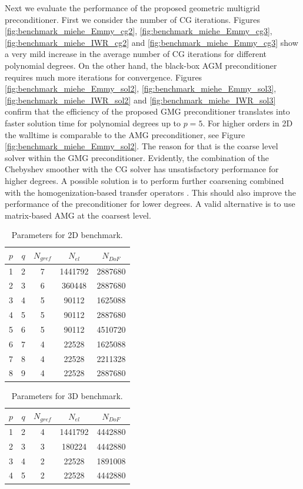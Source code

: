 \documentclass[preprint,12pt,times]{elsarticle}
\begin{document}
Next we evaluate the performance of the proposed geometric multigrid preconditioner. First we consider the number of CG iterations.
Figures \ref{fig:benchmark_miehe_Emmy_cg2}, \ref{fig:benchmark_miehe_Emmy_cg3}, \ref{fig:benchmark_miehe_IWR_cg2} and \ref{fig:benchmark_miehe_Emmy_cg3} show a very mild increase in the average number of CG iterations for different polynomial degrees. On the other hand, the black-box AGM preconditioner requires much more iterations for convergence.
Figures \ref{fig:benchmark_miehe_Emmy_sol2}, \ref{fig:benchmark_miehe_Emmy_sol3}, \ref{fig:benchmark_miehe_IWR_sol2} and \ref{fig:benchmark_miehe_IWR_sol3} confirm that the efficiency of the proposed GMG preconditioner translates into faster solution time for polynomial degrees up to $p=5$. For higher orders in 2D the walltime is comparable to the AMG preconditioner, see Figure \ref{fig:benchmark_miehe_Emmy_sol2}.
The reason for that is the coarse level solver within the GMG preconditioner. Evidently, the combination of the Chebyshev smoother with the CG solver has unsatisfactory performance for higher degrees.
A possible solution is to perform further coarsening combined with the homogenization-based transfer operators \cite{Miehe2007}. This should also improve the performance of the preconditioner for lower degrees.
A valid alternative is to use matrix-based AMG at the coarsest level.

\begin{table}
  \centering
  \begin{tabular}{ccccc}
  \hline
    $p$ & $q$ & $N_{gref}$ & $N_{el}$ & $N_{DoF}$ \\
  \hline
    1 & 2 & 7 & 1441792 & 2887680 \\
    2 & 3 & 6 & 360448 & 2887680 \\
    3 & 4 & 5 & 90112 & 1625088 \\
    4 & 5 & 5 & 90112 & 2887680 \\
    5 & 6 & 5 & 90112 & 4510720 \\
    6 & 7 & 4 & 22528 & 1625088 \\
    7 & 8 & 4 & 22528 & 2211328 \\
    8 & 9 & 4 & 22528 & 2887680 \\
  \hline
  \end{tabular}
  \caption{Parameters for 2D benchmark.
  }
  \label{tab:input_parameters_2d}
\end{table}

\begin{table}
  \centering
  \begin{tabular}{ccccc}
  \hline
    $p$ & $q$ & $N_{gref}$ & $N_{el}$ & $N_{DoF}$ \\
  \hline
    1 & 2 & 4 & 1441792 & 4442880 \\
    2 & 3 & 3 & 180224 & 4442880 \\
    3 & 4 & 2 & 22528 & 1891008 \\
    4 & 5 & 2 & 22528 & 4442880 \\
  \hline
  \end{tabular}
  \caption{Parameters for 3D benchmark.
  }
  \label{tab:input_parameters_3d}
\end{table}
\end{document}

